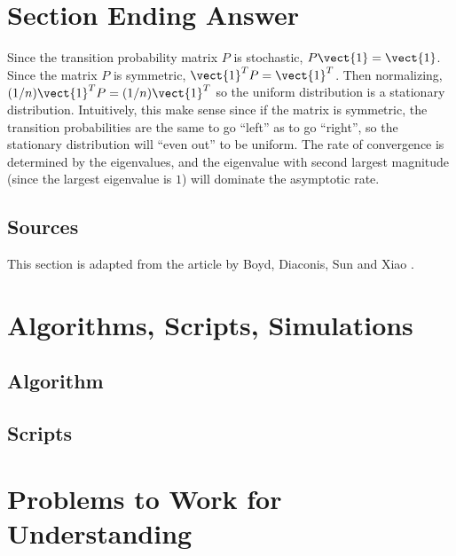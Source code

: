 \documentclass[12pt]{article}
\begin{document}
\hr

\section*{Section Ending Answer}

Since the transition probability matrix \( P \) is stochastic, \( P
\vect{1} = \vect{1} \).  Since the matrix \( P \) is symmetric, \( \vect
{1}^{T} P = \vect{1}^{T} \).  Then normalizing, \( (1/n)\vect{1}^{T} P =
(1/n)\vect{1}^{T} \) so the uniform distribution is a stationary
distribution.  Intuitively, this make sense since if the matrix is
symmetric, the transition probabilities are the same to go ``left'' as
to go ``right'', so the stationary distribution will ``even out'' to be
uniform.  The rate of convergence is determined by the eigenvalues, and
the eigenvalue with second largest magnitude (since the largest
eigenvalue is \( 1 \)) will dominate the asymptotic rate.

\subsection*{Sources}

This section is adapted from the article by Boyd, Diaconis, Sun and
Xiao
\cite{doi:10.1080/00029890.2006.11920281}.

\hr

\section*{Algorithms, Scripts, Simulations}

\subsection*{Algorithm}

\subsection*{Scripts}


\hr

\section*{Problems to Work for Understanding}
\end{document}

